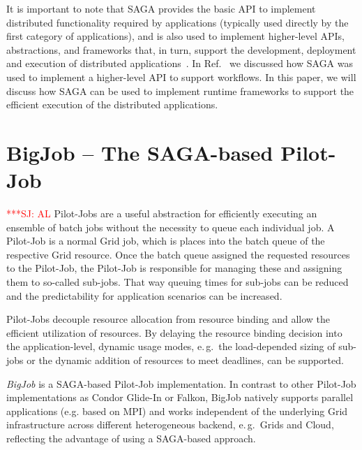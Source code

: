 \documentclass[conference,final]{IEEEtran}
\newcommand{\jhanote}[1]{ {\textcolor{red} { ***SJ: #1 }}}
\newcommand{\jhanote}[1]{}
\begin{document}
It is important to note that SAGA provides the basic API to
implement distributed functionality required by applications
(typically used directly by the first category of applications),
and is also used to implement higher-level APIs, abstractions, and
frameworks that, in turn, support the development, deployment and
execution of distributed
applications~\cite{enkf-gmac09,saga_data_intensive_abstractions}. In
Ref.~\cite{sagamontage09} we discussed how SAGA was used to
implement a higher-level API to support workflows. In this paper, 
we will discuss how SAGA can be used to implement runtime
frameworks to support the efficient execution of the distributed
applications.


\section{BigJob -- The SAGA-based Pilot-Job} \jhanote{AL}
Pilot-Jobs are a useful abstraction for efficiently executing an
ensemble of batch jobs without the necessity to queue each individual
job. A Pilot-Job is a normal Grid job, which is places into the batch
queue of the respective Grid resource. Once the batch queue assigned
the requested resources to the Pilot-Job, the Pilot-Job is responsible
for managing these and assigning them to so-called sub-jobs.  That way
queuing times for sub-jobs can be reduced and the predictability for
application scenarios can be increased.


Pilot-Jobs decouple resource allocation from resource binding and
allow the efficient utilization of resources. By delaying the resource
binding decision into the application-level, dynamic usage modes,
e.\,g.\ the load-depended sizing of sub-jobs or the dynamic addition
of resources to meet deadlines, can be supported.

\emph{BigJob} is a SAGA-based Pilot-Job implementation. In contrast to other
Pilot-Job implementations as Condor Glide-In or Falkon, BigJob
natively supports parallel applications (e.g. based on MPI) and works
independent of the underlying Grid infrastructure across different
heterogeneous backend, e.\,g.\ Grids and Cloud, reflecting the
advantage of using a SAGA-based approach. 
\end{document}
